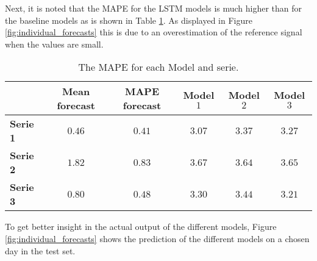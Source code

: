 Next, it is noted that the MAPE for the LSTM models is much higher than for the baseline models as is shown in Table \ref{tab:summary_MAPE_error}. As displayed in Figure \ref{fig:individual_forecasts} this is due to an overestimation of the reference signal when the values are small.\\


\begin{table}[h]
	\centering
	\begin{tabular}{@{}l|ccccc@{}} \toprule
		&\textbf{Mean forecast} & \textbf{MAPE forecast} & \textbf{Model $ 1 $} & \textbf{Model $ 2 $} & \textbf{Model $ 3 $}\\\midrule
		\textbf{Serie 1} & $0.46 $&$ 0.41$  & $3.07 $ & $3.37 $  & $3.27 $\\
		\textbf{Serie 2} & $1.82 $&$ 0.83 $  & $3.67$ & $3.64 $  & $3.65 $\\
		\textbf{Serie 3} & $0.80 $&$ 0.48 $  & $3.30$ & $3.44 $ & $3.21 $\\\bottomrule
	\end{tabular}
	\caption{The MAPE for each Model and serie.}
	\label{tab:summary_MAPE_error}
\end{table}

To get better insight in the actual output of the different models, Figure \ref{fig:individual_forecasts} shows the prediction of the different models on a chosen day in the test set.\\
 
